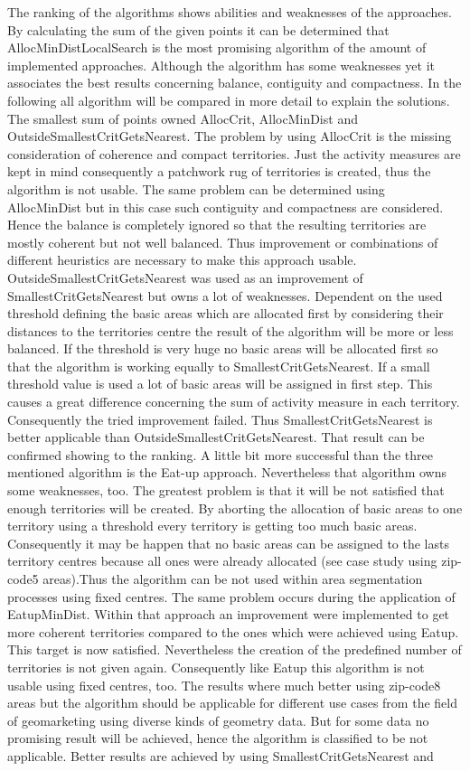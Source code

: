 The ranking of the algorithms shows abilities and weaknesses of the approaches. By calculating the sum of the given points it can be determined that AllocMinDistLocalSearch is the most promising algorithm of the amount of implemented approaches. Although the algorithm has some weaknesses yet it associates the best results concerning balance, contiguity and compactness. In the following all algorithm will be compared in more detail to explain the solutions. The smallest sum of points owned AllocCrit, AllocMinDist and OutsideSmallestCritGetsNearest. The problem by using AllocCrit is the missing consideration of coherence and compact territories. Just the activity measures are kept in mind consequently a patchwork rug of territories is created, thus the algorithm is not usable. The same problem can be determined using AllocMinDist but in this case such contiguity and compactness are considered. Hence the balance is completely ignored so that the resulting territories are mostly coherent but not well balanced. Thus improvement or combinations of different heuristics are necessary to make this approach usable. OutsideSmallestCritGetsNearest was used as an improvement of SmallestCritGetsNearest but owns a lot of weaknesses. Dependent on the used threshold defining the basic areas which are allocated first by considering their distances to the territories centre the result of the algorithm will be more or less balanced. If the threshold is very huge no basic areas will be allocated first so that the algorithm is working equally to SmallestCritGetsNearest. If a small threshold value is used a lot of basic areas will be assigned in first step. This causes a great difference concerning the sum of activity measure in each territory. Consequently the tried improvement failed. Thus SmallestCritGetsNearest is better applicable than OutsideSmallestCritGetsNearest. That result can be confirmed showing to the ranking. A little bit more successful than the three mentioned algorithm is the Eat-up approach. Nevertheless that algorithm owns some weaknesses, too. The greatest problem is that it will be not satisfied that enough territories will be created. By aborting the allocation of basic areas to one territory using a threshold every territory is getting too much basic areas. Consequently it may be happen that no basic areas can be assigned to the lasts territory centres because all ones were already allocated (see case study using zip-code5 areas).Thus the algorithm can be not used within area segmentation processes using fixed centres. The same problem occurs during the application of EatupMinDist. Within that approach an improvement were implemented to get more coherent territories compared to the ones which were achieved using Eatup. This target is now satisfied. Nevertheless the creation of the predefined number of territories is not given again. Consequently like Eatup this algorithm is not usable using fixed centres, too. The results where much better using zip-code8 areas but the algorithm should be applicable for different use cases from the field of geomarketing using diverse kinds of geometry data. But for some data no promising result will be achieved, hence the algorithm is classified to be not applicable. Better results are achieved by using SmallestCritGetsNearest and 